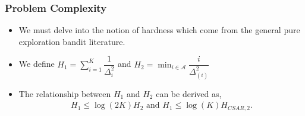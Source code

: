 \begin{frame}
\frametitle{Problem Complexity}
\begin{itemize}
\item<1-> We must delve into the notion of hardness which come from the general pure exploration bandit literature.
\item<2-> We define $H_{1} = \sum_{i=1}^{K}\dfrac{1}{\Delta_{i}^{2}}$ and $
H_{2} =\min_{i\in \mathcal{A}}\dfrac{i}{{\Delta_{(i)}^{2}}} $
%
\item<3-> The relationship between $H_1$ and $H_2$ can be derived as,
\begin{align*}
H_{1}\leq \log(2K)H_{2} \mbox{ and }
 H_1 \leq \log(K)H_{CSAR,2}.
\end{align*}
\end{itemize}
\end{frame}

